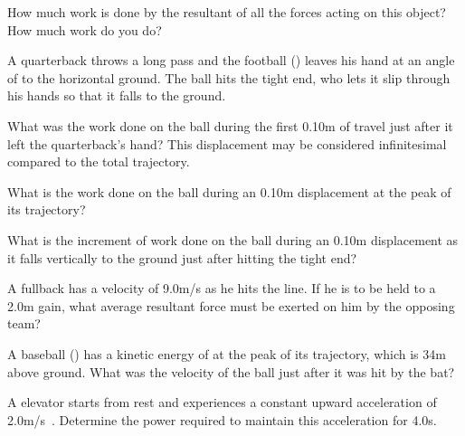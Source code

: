 {\begin{one-digit-list}
\item []   How much work is done by the resultant of all the forces acting on
           this object?  How much work do you do?  

\item [2.] A quarterback throws a long pass and the football
          () leaves his hand at an angle of
            to the horizontal ground.
           The ball hits the tight end, who lets it slip through his hands
           so that it falls to the ground.
\begin{one-digit-list}
\item [a.] What was the work done on the ball during the first 0.10\unit{m} of
           travel just after it left the quarterback's hand?
           This displacement may be considered infinitesimal compared to the
           total trajectory.  
\item [b.] What is the work done on the ball during an 0.10\unit{m} displacement
           at the peak of its trajectory?  
\item [c.] What is the increment of work done on the ball during an 0.10\unit{m}
           displacement as it falls vertically to the ground just after
           hitting the tight end?  
\end{one-digit-list}

\item [3.] A  fullback has a velocity of 9.0\unit{m/s} as he
           hits the line.
           If he is to be held to a 2.0\unit{m} gain, what average resultant
           force must be exerted on him by the opposing team?  

\item [4.] A baseball () has a kinetic energy of
            at the peak of its trajectory, which is 34\unit{m} above ground.
           What was the velocity of the ball just after it was hit by the bat?  

\item [5.] A  elevator starts from rest and experiences
           a constant upward acceleration of 2.0\unit{m/s}.
           Determine the power required to maintain this acceleration for
           4.0\unit{s}.  
\end{one-digit-list}

\newpage

}

